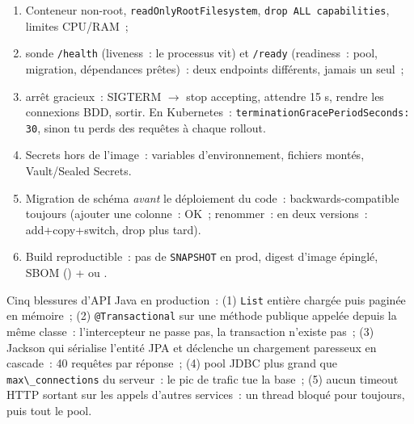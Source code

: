 \begin{enumerate}
  \item Conteneur non-root, \verb|readOnlyRootFilesystem|, \verb|drop ALL capabilities|, limites CPU/RAM~;
  \item sonde \verb|/health| (liveness~: le processus vit) et \verb|/ready| (readiness~: pool,
        migration, d\'ependances pr\^etes)~: deux endpoints diff\'erents, jamais un seul~;
  \item arr\^et gracieux~: SIGTERM $\rightarrow$ stop accepting, attendre 15 s, rendre les connexions BDD, sortir.
        En Kubernetes~: \verb|terminationGracePeriodSeconds: 30|, sinon tu perds des requ\^etes \`a chaque rollout.
  \item Secrets hors de l'image~: variables d'environnement, fichiers mont\'es, Vault/Sealed Secrets.
  \item Migration de sch\'ema \emph{avant} le d\'eploiement du code~: backwards-compatible toujours
        (ajouter une colonne~: OK~; renommer~: en deux versions~: add+copy+switch, drop plus tard).
  \item Build reproductible~: pas de \verb|SNAPSHOT| en prod, digest d'image \'epingl\'e, SBOM
        ()
        +  ou
        .
\end{enumerate}

\begin{piege}
Cinq blessures d'API Java en production~: (1) \verb|List| enti\`ere charg\'ee puis pagin\'ee en m\'emoire~;
(2) \verb|@Transactional| sur une m\'ethode publique appel\'ee depuis la m\^eme classe~: l'intercepteur
ne passe pas, la transaction n'existe pas~; (3) Jackson qui s\'erialise l'entit\'e JPA et d\'eclenche un
chargement paresseux en cascade~: 40 requ\^etes par r\'eponse~; (4) pool JDBC plus grand que
\verb|max\_connections| du serveur~: le pic de trafic tue la base~; (5) aucun timeout HTTP sortant
sur les appels d'autres services~: un thread bloqu\'e pour toujours, puis tout le pool.
\end{piege}

